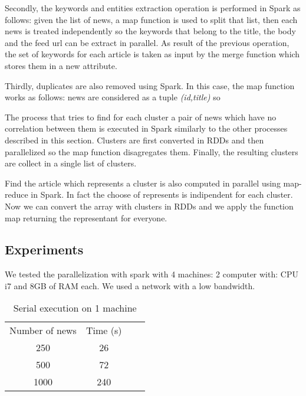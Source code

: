 \documentclass{acm_proc_article-sp}
\begin{document}

Secondly, the keywords and entities extraction operation is performed in Spark as follows: given the list of news, a map function is used to split that list, then each news is treated independently so the keywords that belong to the title, the body and the feed url can be extract in parallel. As result of the previous operation, the set of keywords for each article is taken as input by the merge function which stores them in a new attribute.

Thirdly, duplicates are also removed using Spark. In this case, the map function works as follows: news are considered as a tuple \textit{(id,title)} so

The process that tries to find for each cluster a pair of news which have no correlation between them is executed in Spark similarly to the other processes described in this section. Clusters are first converted in RDDs and then parallelized so the map function disagregates them. Finally, the resulting clusters are collect in a single list of clusters.

Find the article which represents a cluster is also computed in parallel using map-reduce in Spark. In fact the choose of represents is indipendent for each cluster. Now we can convert the array with clusters in RDDs and we apply the function map returning the representant for everyone.

\subsection{Experiments}

We tested the parallelization with spark with 4 machines: 2 computer with: CPU i7 and 8GB of RAM each. We used a network with a low bandwidth.

\begin{table}[!ht]
\centering
\label{serial}
\begin{tabular}{cccc}
Number of news & Time (s) \\
250            & 26       \\
500            & 72       \\
1000           & 240      \\
\end{tabular}
\caption{Serial execution on 1 machine}
\end{table}
\end{document}
